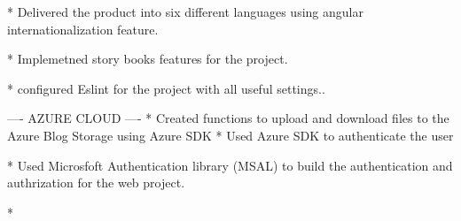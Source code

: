 * Delivered the product into six different languages using angular internationalization feature.

* Implemetned story books features for the project.

* configured Eslint for the project with all useful settings..



---- 
AZURE CLOUD
----
* Created functions to upload and download files to the Azure Blog Storage using Azure SDK
* Used Azure SDK to authenticate the user

* Used Microsfoft Authentication library (MSAL) to build the authentication and authrization for the web project.

* 